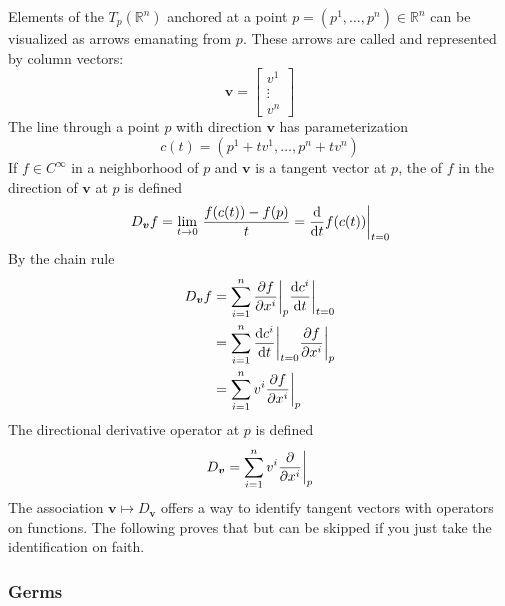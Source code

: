 Elements of the  \(T_p (\mathbb{R}^n)\) anchored at a point \(p = (p^1, \dots, p^n) \in \mathbb{R}^n\) can be visualized as arrows emanating from \(p\).
%
These arrows are called  and represented by column vectors:
%
\begin{equation}
    \bm{v} 
    = 
    \begin{bmatrix}
        v^1 \\ \vdots \\ v^n    
    \end{bmatrix}  
\end{equation}
%
The line through a point \(p\) with direction \(\bm{v}\) has parameterization
%
\begin{equation}
    c(t) = \left( p^1 + t v^1, \dots, p^n + t v^n \right) 
\end{equation}
%
If \(f \in C^\infty\) in a neighborhood of \(p\) and \(\bm{v}\) is a tangent vector at \(p\), the  of \(f\) in the direction of \(\bm{v}\) at \(p\) is defined
%
\begin{equation}
   D_{\bm{v}} f 
   = 
   \lim_{t\rightarrow 0}\, \frac{f(c(t)) - f(p)}{t} 
   = 
   \evalat[\bigg]{\dv{}{t} f(c(t))}{t=0}
\end{equation}
%
By the chain rule 
%
\begin{align}
   D_{\bm{v}} f &= \sum_{i=1}^{n} \evalat[\bigg]{\pdv{f}{x^i}}{p} \evalat[\bigg]{\dv{c^i}{t}}{t=0} \\
   &= \sum_{i=1}^{n} \evalat[\bigg]{\dv{c^i}{t}}{t=0} \evalat[\bigg]{\pdv{f}{x^i}}{p}  \\
   &= \sum_{i=1}^{n} v^i \evalat[\bigg]{\pdv{f}{x^i}}{p}\label{eqn:chainrule}  \\
\end{align}
%
The directional derivative operator at \(p\) is defined
%
\begin{equation}
    D_{\bm{v}} = \sum_{i=1}^{n} v^i \evalat[\bigg]{\pdv{}{x^i}}{p}
\end{equation}
%
The association \(\bm{v} \mapsto D_{\bm{v}}\) offers a way to  identify tangent vectors with operators on functions.
%
The following proves that but can be skipped if you just take the identification on faith.

\subsubsection{Germs}

